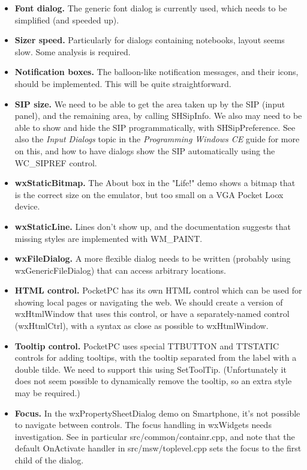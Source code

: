 \itemsep=0pt
\begin{itemize}
\item {\bf Font dialog.} The generic font dialog is currently used, which
needs to be simplified (and speeded up).
\item {\bf Sizer speed.} Particularly for dialogs containing notebooks,
layout seems slow. Some analysis is required.
\item {\bf Notification boxes.} The balloon-like notification messages, and their
icons, should be implemented. This will be quite straightforward.
\item {\bf SIP size.} We need to be able to get the area taken up by the SIP (input panel),
and the remaining area, by calling SHSipInfo. We also may need to be able to show and hide
the SIP programmatically, with SHSipPreference. See also the {\it Input Dialogs} topic in
the {\it Programming Windows CE} guide for more on this, and how to have dialogs
show the SIP automatically using the WC\_SIPREF control.
\item {\bf wxStaticBitmap.} The About box in the "Life!" demo shows a bitmap that is
the correct size on the emulator, but too small on a VGA Pocket Loox device.
\item {\bf wxStaticLine.} Lines don't show up, and the documentation suggests that
missing styles are implemented with WM\_PAINT.
\item {\bf wxFileDialog.} A more flexible dialog needs to be written (probably using wxGenericFileDialog)
that can access arbitrary locations.
\item {\bf HTML control.} PocketPC has its own HTML control which can be used for showing
local pages or navigating the web. We should create a version of wxHtmlWindow that uses this
control, or have a separately-named control (wxHtmlCtrl), with a syntax as close as possible to wxHtmlWindow.
\item {\bf Tooltip control.} PocketPC uses special TTBUTTON and TTSTATIC controls for adding
tooltips, with the tooltip separated from the label with a double tilde. We need to support this using SetToolTip.
(Unfortunately it does not seem possible to dynamically remove the tooltip, so an extra style may
be required.)
\item {\bf Focus.} In the wxPropertySheetDialog demo on Smartphone, it's not possible to navigate
between controls. The focus handling in wxWidgets needs investigation. See in particular src/common/containr.cpp,
and note that the default OnActivate handler in src/msw/toplevel.cpp sets the focus to the first child of the dialog.

\end{itemize}
